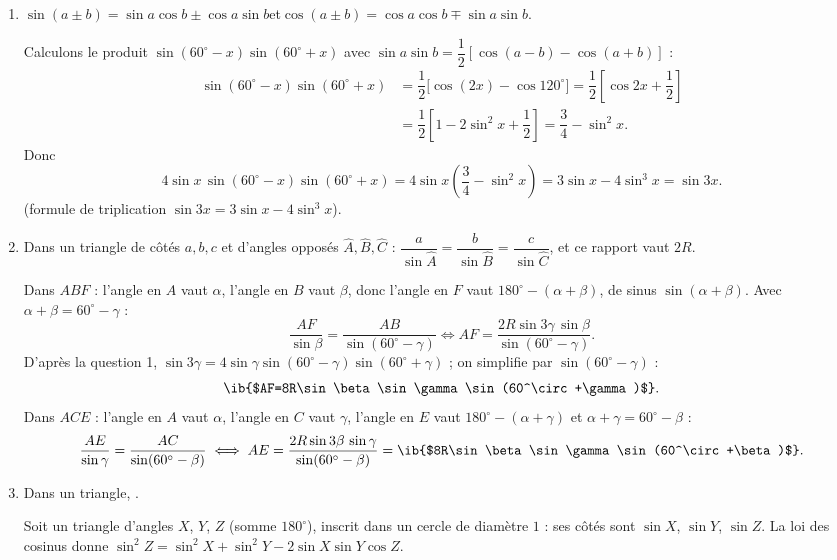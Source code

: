 \begin{enumerate}[itemsep=14pt]
  \item\leavevmode
  \begin{prop}
  \textbf{$\sin(a\pm b)=\sin a\cos b\pm\cos a\sin b$}\quad et\quad \textbf{$\cos(a\pm b)=\cos a\cos b\mp\sin a\sin b$}.
  \end{prop}
  Calculons le produit $\sin(60^\circ-x)\sin(60^\circ+x)$ avec $\sin a\sin b=\dfrac12[\cos(a-b)-\cos(a+b)]$ :
  \[\begin{aligned}\sin(60^\circ-x)\sin(60^\circ+x)&=\dfrac12\big[\cos(2x)-\cos120^\circ\big]=\dfrac12\left[\cos2x+\dfrac12\right]\\ &=\dfrac12\left[1-2\sin^2x+\dfrac12\right]=\dfrac34-\sin^2x.\end{aligned}\]
  Donc
  \[4\sin x\,\sin(60^\circ-x)\sin(60^\circ+x)=4\sin x\left(\dfrac34-\sin^2x\right)=3\sin x-4\sin^3x=\sin3x.\]
  (formule de triplication $\sin3x=3\sin x-4\sin^3x$).

  \item\leavevmode
  \begin{prop}
  Dans un triangle de côtés $a,b,c$ et d'angles opposés $\hat A,\hat B,\hat C$ : \textbf{$\dfrac{a}{\sin\hat A}=\dfrac b{\sin\hat B}=\dfrac c{\sin\hat C}$}, et ce rapport vaut $2R$.
  \end{prop}
  Dans $ABF$ : l'angle en $A$ vaut $\alpha$, l'angle en $B$ vaut $\beta$, donc l'angle en $F$ vaut $180^\circ-(\alpha+\beta)$, de sinus $\sin(\alpha+\beta)$. Avec $\alpha+\beta=60^\circ-\gamma$ :
  \[\dfrac{AF}{\sin\beta}=\dfrac{AB}{\sin(60^\circ-\gamma)}\iff AF=\dfrac{2R\sin3\gamma\,\sin\beta}{\sin(60^\circ-\gamma)}.\]
  D'après la question 1, $\sin3\gamma=4\sin\gamma\sin(60^\circ-\gamma)\sin(60^\circ+\gamma)$ ; on simplifie par $\sin(60^\circ-\gamma)$ :
  \[\ib{$AF=8R\sin\beta\sin\gamma\sin(60^\circ+\gamma)$}.\]
  Dans $ACE$ : l'angle en $A$ vaut $\alpha$, l'angle en $C$ vaut $\gamma$, l'angle en $E$ vaut $180^\circ-(\alpha+\gamma)$ et $\alpha+\gamma=60^\circ-\beta$ :
  \[\dfrac{AE}{\sin\gamma}=\dfrac{AC}{\sin(60^\circ-\beta)}\iff AE=\dfrac{2R\sin3\beta\,\sin\gamma}{\sin(60^\circ-\beta)}=\ib{$8R\sin\beta\sin\gamma\sin(60^\circ+\beta)$}.\]

  \item\leavevmode
  \begin{prop}
  Dans un triangle, .
  \end{prop}
  Soit un triangle d'angles $X$, $Y$, $Z$ (somme $180^\circ$), inscrit dans un cercle de diamètre $1$ : ses côtés sont $\sin X$, $\sin Y$, $\sin Z$. La loi des cosinus donne $\sin^2Z=\sin^2X+\sin^2Y-2\sin X\sin Y\cos Z$.


\end{enumerate}
